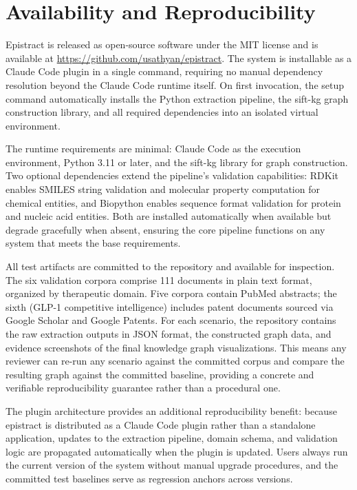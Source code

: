 \section{Availability and Reproducibility}

Epistract is released as open-source software under the MIT license and is available at \url{https://github.com/usathyan/epistract}. The system is installable as a Claude Code plugin in a single command, requiring no manual dependency resolution beyond the Claude Code runtime itself. On first invocation, the setup command automatically installs the Python extraction pipeline, the sift-kg graph construction library, and all required dependencies into an isolated virtual environment.

The runtime requirements are minimal: Claude Code as the execution environment, Python 3.11 or later, and the sift-kg library for graph construction. Two optional dependencies extend the pipeline's validation capabilities: RDKit enables SMILES string validation and molecular property computation for chemical entities, and Biopython enables sequence format validation for protein and nucleic acid entities. Both are installed automatically when available but degrade gracefully when absent, ensuring the core pipeline functions on any system that meets the base requirements.

All test artifacts are committed to the repository and available for inspection. The six validation corpora comprise 111 documents in plain text format, organized by therapeutic domain. Five corpora contain PubMed abstracts; the sixth (GLP-1 competitive intelligence) includes patent documents sourced via Google Scholar and Google Patents. For each scenario, the repository contains the raw extraction outputs in JSON format, the constructed graph data, and evidence screenshots of the final knowledge graph visualizations. This means any reviewer can re-run any scenario against the committed corpus and compare the resulting graph against the committed baseline, providing a concrete and verifiable reproducibility guarantee rather than a procedural one.

The plugin architecture provides an additional reproducibility benefit: because epistract is distributed as a Claude Code plugin rather than a standalone application, updates to the extraction pipeline, domain schema, and validation logic are propagated automatically when the plugin is updated. Users always run the current version of the system without manual upgrade procedures, and the committed test baselines serve as regression anchors across versions.

